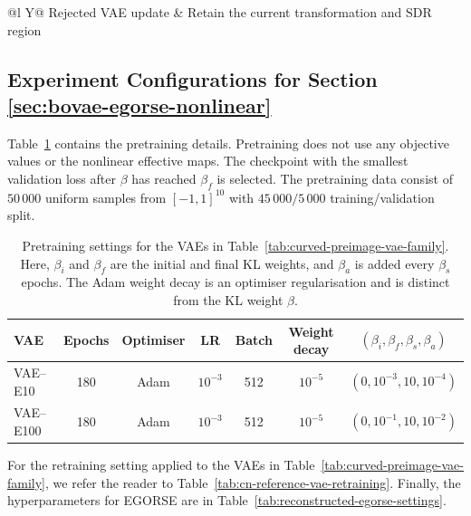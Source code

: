 \documentclass[pdflatex,sn-mathphys-num]{sn-jnl}%
\theoremstyle{thmstyleone}%
\theoremstyle{thmstyletwo}%
\theoremstyle{thmstylethree}%
\begin{document}
\begin{appendices}
\begin{table}[h]
\begin{tabularx}{\linewidth}{@{}l Y@{}}
Rejected VAE update
& Retain the current transformation and SDR region \\

\bottomrule
\end{tabularx}
\end{table}

\subsection{Experiment Configurations for Section \ref{sec:bovae-egorse-nonlinear}} \label{Appendix Exp set up for comparison against EGORSE}

Table~\ref{tab:curved-preimage-vae-pretraining} contains the pretraining details. Pretraining does not use any objective values or the nonlinear effective maps. The checkpoint with the smallest validation loss after $\beta$ has reached $\beta_f$ is selected. The pretraining data consist of $50\,000$ uniform samples from $[-1,1]^{10}$ with $45\,000/5\,000$ training/validation split.
\begin{table}[h]
\caption{Pretraining settings for the VAEs in Table~\ref{tab:curved-preimage-vae-family}. Here, $\beta_i$ and $\beta_f$ are the initial and final KL weights, and $\beta_a$ is added every $\beta_s$ epochs. The Adam weight decay is an optimiser regularisation and is distinct from the KL weight $\beta$.}
\label{tab:curved-preimage-vae-pretraining}
\centering
\small
\setlength{\tabcolsep}{4pt}
\renewcommand{\arraystretch}{1.1}

\begin{tabularx}{\linewidth}{@{}l c c c c c c@{}}
\toprule
VAE & Epochs & Optimiser & LR & Batch
& Weight decay & $(\beta_i,\beta_f,\beta_s,\beta_a)$\\
\midrule

VAE--E10
& 180
& Adam
& $10^{-3}$
& 512
& $10^{-5}$
& $(0,10^{-3},10,10^{-4})$ \\

VAE--E100
& 180
& Adam
& $10^{-3}$
& 512
& $10^{-5}$
& $(0,10^{-1},10,10^{-2})$\\

\bottomrule
\end{tabularx}
\end{table}

For the retraining setting applied to the VAEs in Table~\ref{tab:curved-preimage-vae-family}, we refer the reader to Table~\ref{tab:cn-reference-vae-retraining}. Finally, the hyperparameters for EGORSE are in Table~\ref{tab:reconstructed-egorse-settings}.


\end{appendices}
\end{document}
